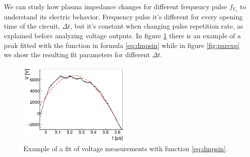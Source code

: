 We can study how plasma impedance changes for different frequency pulse $f_{V_{s}}$ to understand its electric behavior. Frequency pulse it's different for every opening time of the circuit, $\Delta t$, but it's constant when changing pulse repetition rate, as explained before analyzing voltage outputs. In figure \ref{fig:fitexp} there is an example of a peak fitted with the function in formula \ref{eq:dmpsin} %
while in figure \ref{fig:parexp} we show the resulting fit parameters for different $\Delta t$.
\begin{figure}
 \centering
 \includegraphics[width=0.5\textwidth]{Images/Electric/VFitexp_f8_t5_2.png}
 \caption{Example of a fit of voltage measurements with function \ref{eq:dmpsin}.}
 \label{fig:fitexp}
\end{figure}

